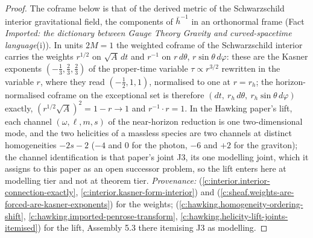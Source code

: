 \documentclass[11pt]{article}
\theoremstyle{definition}
\theoremstyle{plain}
\providecommand{\hb}{}\renewcommand{\hb}{\bar{h}}
\begin{document}
\begin{proof}
The coframe below is that of the derived metric of the Schwarzschild interior gravitational field, the components of $\hb^{-1}$ in an orthonormal frame (Fact \emph{Imported: the dictionary between Gauge Theory Gravity and curved-spacetime language}(i)). In units $2M = 1$ the weighted coframe of the Schwarzschild interior carries the weights $r^{1/2}$ on $\sqrt{A}\,dt$ and $r^{-1}$ on $r\,d\theta$, $r\sin\theta\,d\varphi$: these are the Kasner exponents $(-\tfrac13, \tfrac23, \tfrac23)$ of the proper-time variable $\tau \propto r^{3/2}$ rewritten in the variable $r$, where they read $(-\tfrac12, 1, 1)$, normalised to one at $r = r_h$; the horizon-normalised coframe on the exceptional set is therefore $(dt,\ r_h\,d\theta,\ r_h\sin\theta\,d\varphi)$ exactly, $(r^{1/2}\sqrt{A})^2 = 1 - r \to 1$ and $r^{-1}\cdot r = 1$. In the Hawking paper's lift, each channel $(\omega, \ell, m, s)$ of the near-horizon reduction is one two-dimensional mode, and the two helicities of a massless species are two channels at distinct homogeneities $-2s - 2$ ($-4$ and $0$ for the photon, $-6$ and $+2$ for the graviton); the channel identification is that paper's joint J3, its one modelling joint, which it assigns to this paper as an open successor problem, so the lift enters here at modelling tier and not at theorem tier. \emph{Provenance:} \cite[Lemmas 5.1 to 5.3, Def.~5.5]{ButlerT6} (\ref{c:interior.interior-connection-exactly}, \ref{c:interior.kasner-form-interior}) and \cite[Thm.~8.16]{ButlerT4} (\ref{c:sheaf.weights-are-forced-are-kasner-exponents}) for the weights; \cite[Fact~5.1, Prop.~5.2, Assembly~5.3]{ButlerT7} (\ref{c:hawking.homogeneity-ordering-shift}, \ref{c:hawking.imported-penrose-transform}, \ref{c:hawking.helicity-lift-joints-itemised}) for the lift, Assembly 5.3 there itemising J3 as modelling.

\end{proof}
\end{document}
